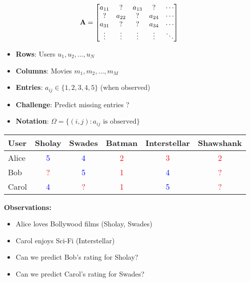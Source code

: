 \documentclass{beamer}
\begin{document}
\begin{frame}\begin{equation*}
\mathbf{A} = \begin{bmatrix}
a_{11} & ? & a_{13} & ? & \cdots \\
? & a_{22} & ? & a_{24} & \cdots \\
a_{31} & ? & ? & a_{34} & \cdots \\
\vdots & \vdots & \vdots & \vdots & \ddots
\end{bmatrix}
\end{equation*}

\pause
\begin{itemize}
\item \textbf{Rows}: Users $u_1, u_2, \ldots, u_N$ 
    \pause
\item \textbf{Columns}: Movies $m_1, m_2, \ldots, m_M$
    \pause
\item \textbf{Entries}: $a_{ij} \in \{1,2,3,4,5\}$ (when observed)
    \pause
\item \textbf{Challenge}: Predict missing entries $?$
    \pause
\item \textbf{Notation}: $\Omega = \{(i,j) : a_{ij} \text{ is observed}\}$
\end{itemize}
\end{frame}

\begin{frame}\begin{center}
\renewcommand{\arraystretch}{1.2}
\begin{tabular}{l|ccccc}
\toprule
\textbf{User} & \textbf{Sholay} & \textbf{Swades} & \textbf{Batman} & \textbf{Interstellar} & \textbf{Shawshank} \\
\midrule
Alice & \textcolor{blue}{5} & \textcolor{blue}{4} & \textcolor{red}{2} & \textcolor{red}{3} & \textcolor{red}{2} \\
Bob & \textcolor{red}{?} & \textcolor{blue}{5} & \textcolor{red}{1} & \textcolor{blue}{4} & \textcolor{red}{?} \\
Carol & \textcolor{blue}{4} & \textcolor{red}{?} & \textcolor{red}{1} & \textcolor{blue}{5} & \textcolor{red}{?} \\
\bottomrule
\end{tabular}
\end{center}

\pause
\textbf{Observations:}
\begin{itemize}
\item Alice loves Bollywood films (Sholay, Swades)
    \item Carol enjoys Sci-Fi (Interstellar)  
    \pause
\item Can we predict Bob's rating for Sholay?
    \item Can we predict Carol's rating for Swades?
\end{itemize}
\end{frame}
\end{document}
